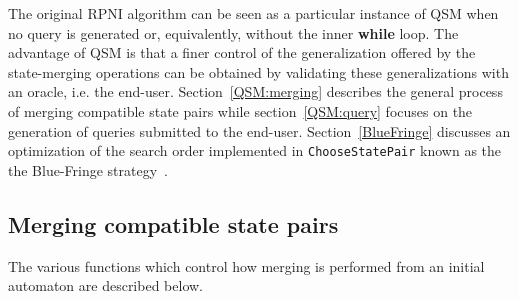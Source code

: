 The original RPNI algorithm can be seen as a particular instance of \textsc{QSM} when no query is generated or, equivalently, without the inner \textbf{while} loop. The advantage of \textsc{QSM} is that a finer control of the generalization offered by the state-merging operations can be obtained by validating these generalizations with an oracle, i.e. the end-user. Section~\ref{QSM:merging} describes the general process of merging compatible state pairs while section~\ref{QSM:query} focuses on the generation of queries submitted to the end-user. Section~\ref{BlueFringe} discusses an optimization of the search order implemented in \texttt{ChooseStatePair} known as the the Blue-Fringe strategy~\cite{Lang:1998}.

\subsection{Merging compatible state pairs\label{QSM:merging}}

The various functions which control how merging is performed from an initial automaton are described below. 

